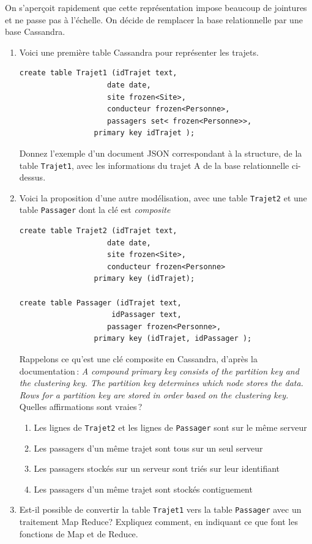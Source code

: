 \documentclass[10pt,a4paper]{article}
\begin{document}
\vspace*{0.2cm}

On s'aperçoit rapidement que cette représentation impose 
beaucoup de jointures et ne passe pas à l'échelle. 
On décide de remplacer la base relationnelle par une base Cassandra. 



\begin{enumerate}
  \item Voici une première table Cassandra pour représenter les trajets.
  
\begin{verbatim}
create table Trajet1 (idTrajet text, 
                    date date, 
                    site frozen<Site>, 
                    conducteur frozen<Personne>, 
                    passagers set< frozen<Personne>>,
                 primary key idTrajet );
\end{verbatim}

 Donnez l'exemple d'un  document JSON correspondant à la structure,
           de la table \texttt{Trajet1},
           avec les informations du trajet A de la base relationnelle ci-dessus.
           
  \item Voici la proposition d'une autre modélisation, avec une
    table \texttt{Trajet2} et une table \texttt{Passager} dont la clé est
      \emph{composite}
    
\begin{verbatim}
create table Trajet2 (idTrajet text, 
                    date date, 
                    site frozen<Site>, 
                    conducteur frozen<Personne>
                 primary key (idTrajet);

create table Passager (idTrajet text, 
                     idPassager text,
                    passager frozen<Personne>,
                 primary key (idTrajet, idPassager );
\end{verbatim}

Rappelons ce qu'est une clé composite en Cassandra, d'après la documentation\,: 
\textit{A compound primary key consists of the partition key and the clustering key. The partition key determines which node stores the data. Rows 
for a partition key are stored in order based on the clustering key.} Quelles affirmations
sont vraies\,?
\begin{enumerate}
  \item Les lignes de \texttt{Trajet2} et les lignes de \texttt{Passager} sont sur le même serveur
      \item Les passagers d'un même trajet sont tous sur un seul serveur 
       \item Les passagers stockés sur un serveur sont triés sur leur identifiant
       \item Les passagers d'un même trajet sont stockés contiguement
\end{enumerate}  

  \item Est-il possible de convertir la table \texttt{Trajet1} 
  vers la table \texttt{Passager} avec un traitement
        Map Reduce? Expliquez comment, en indiquant ce que font les fonctions de Map et de Reduce.
\end{enumerate}
\end{document}
